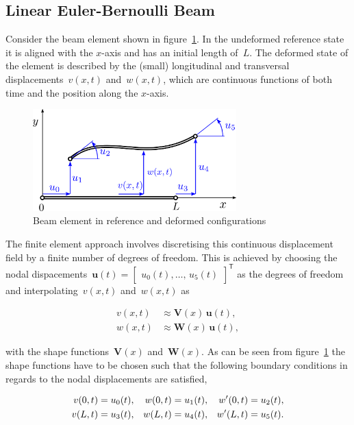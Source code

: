 \subsection{Linear Euler-Bernoulli Beam}

Consider the beam element shown in figure~\ref{fig:beam-linear}.
In the undeformed reference state it is aligned with the $x$-axis and has an initial length of~$L$. The deformed state of the element is described by the (small) longitudinal and transversal displacements~$v(x,t)$ and~$w(x,t)$, which are continuous functions of both time and the position along the $x$-axis.

\begin{figure}[h]
\centering
\includegraphics[width=0.7\textwidth]{figures/elements/beam-linear}
\caption{Beam element in reference and deformed configurations}
\label{fig:beam-linear}
\end{figure}

The finite element approach involves discretising this continuous displacement field by a finite number of degrees of freedom. This is achieved by choosing the nodal dispacements~$\boldsymbol{u}(t) = \begin{bmatrix}u_{0}(t),\ldots,\,u_{5}(t)\end{bmatrix}^\mathsf{T}$ as the degrees of freedom and interpolating~$v(x,t)$ and~$w(x,t)$ as

\begin{align}
v(x,t) &\approx \boldsymbol{V}(x)\,\boldsymbol{u}(t),\\
w(x,t) &\approx \boldsymbol{W}(x)\,\boldsymbol{u}(t),
\end{align}

with the shape functions~$\boldsymbol{V}(x)$ and~$\boldsymbol{W}(x)$.
As can be seen from figure~\ref{fig:beam-linear} the shape functions have to be chosen such that the following boundary conditions in regards to the nodal displacements are satisfied,

\begin{align}
v(0,t) &= u_{0}(t), & w(0,t) &= u_{1}(t), & w'(0,t) &= u_{2}(t),\notag\\
v(L,t) &= u_{3}(t), & w(L,t) &= u_{4}(t), & w'(L,t) &= u_{5}(t).\label{eq:elements:beam:boundary_conditions}
\end{align}

